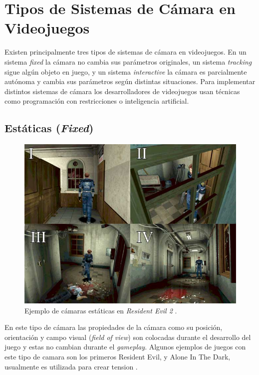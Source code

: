 \section{Tipos de Sistemas de Cámara en Videojuegos}
Existen principalmente tres tipos de sistemas de cámara en videojuegos. En un sistema \emph{fixed} la cámara no cambia sus parámetros originales, un sistema \emph{tracking} sigue algún objeto en juego, y un sistema \emph{interactive} la cámara es parcialmente autónoma y cambia sus parámetros según distintas situaciones. Para implementar distintos sistemas de cámara los desarrolladores de videojuegos usan técnicas como programación con restricciones o inteligencia artificial. 
\subsection{Estáticas (\emph{Fixed})}
\begin{figure}
\includegraphics[width=\linewidth]{media/resident_evil_camerawork.jpg} 
\caption{Ejemplo de cámaras estáticas en \emph{Resident Evil 2} \cite{fixed_camera} \cite{residentevil2}.}
\end{figure}
En este tipo de cámara las propiedades de la cámara como su posición, orientación y campo visual (\emph{field of view}) son colocadas durante el desarrollo del juego y estas no cambian durante el \emph{gameplay}. Algunos ejemplos de juegos con este tipo de camara son los primeros Resident Evil, y Alone In The Dark, usualmente es utilizada para crear tension \cite{res5_review}\cite{fixed_camera}.
